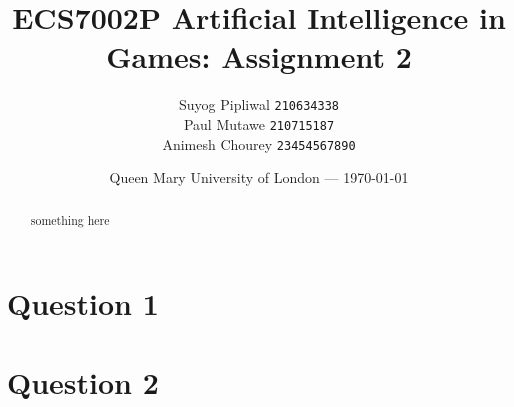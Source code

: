 \documentclass[11pt]{article}
\title{ECS7002P Artificial Intelligence in Games: Assignment 2} %
\author{Suyog Pipliwal \texttt{210634338}\\ 
			Paul Mutawe \texttt{210715187} \\ 
			Animesh Chourey \texttt{23454567890}
} %
\date{Queen Mary University of London --- \today} %
\begin{document}
	\maketitle
\begin{abstract}
	something here
\end{abstract}
\section{Question 1}
\section{Question 2}
\end{document}
